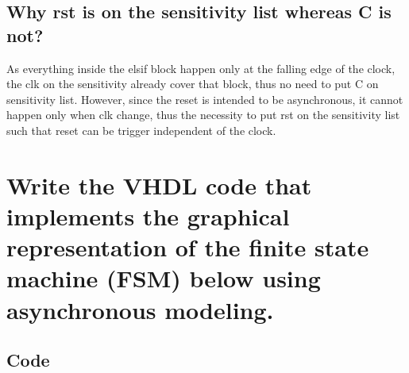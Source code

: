 \documentclass{article}
\begin{document}
\subsection{Why rst is on the sensitivity list whereas C is not?}

As everything inside the elsif block happen only at the falling edge of the clock, 
the clk on the sensitivity already cover that block, thus no need to put C on sensitivity list.
However, since the reset is intended to be asynchronous, it cannot happen only when clk change,
thus the necessity to put rst on the sensitivity list such that reset can be trigger independent of the clock.

\section{Write the VHDL code that implements the graphical representation of the finite state machine (FSM) below using asynchronous modeling.}

\begin{figure}[H]
  \centering
\end{figure}

\subsection*{Code}

\;\\
\end{document}
